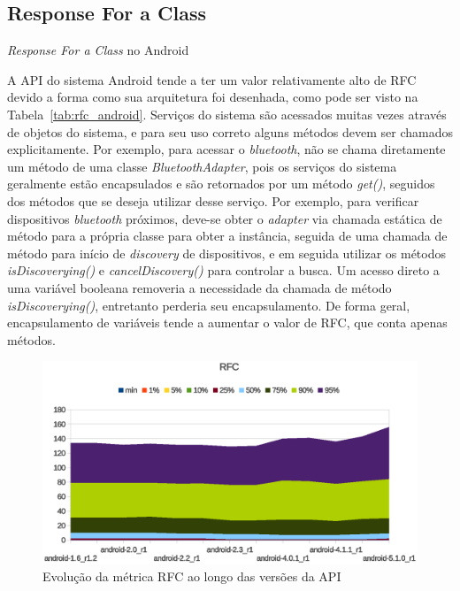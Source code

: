 \subsection{Response For a Class}

\begin{table}[!htb]
\centering
{}

\caption{\textit{Response For a Class} no Android}
\label{tab:rfc_android}
\end{table}

A API do sistema Android tende a ter um valor relativamente alto de RFC devido a forma como sua arquitetura foi desenhada, como pode ser visto na Tabela~\ref{tab:rfc_android}. Serviços do sistema são acessados muitas vezes através de objetos do sistema, e para seu uso correto alguns métodos devem ser chamados explicitamente. Por exemplo, para acessar o \textit{bluetooth}, não se chama diretamente um método de uma classe \textit{BluetoothAdapter}, pois os serviços do sistema geralmente estão encapsulados e são retornados por um método \textit{get()}, seguidos dos métodos que se deseja utilizar desse serviço. Por exemplo, para verificar dispositivos \textit{bluetooth} próximos, deve-se obter o \textit{adapter} via chamada estática de método para a própria classe para obter a instância, seguida de uma chamada de método para início de \textit{discovery} de dispositivos, e em seguida utilizar os métodos \textit{isDiscoverying()} e \textit{cancelDiscovery()} para controlar a busca. Um acesso direto a uma variável booleana removeria a necessidade da chamada de método \textit{isDiscoverying()}, entretanto perderia seu encapsulamento. De forma geral, encapsulamento de variáveis tende a aumentar o valor de RFC, que conta apenas métodos. 

\begin{figure}[!htb]
\centering
\includegraphics [keepaspectratio=true,scale=0.85]{figuras/graphs/rfc_android.eps}
\caption{Evolução da métrica RFC ao longo das versões da API}
\label{fig:rfc_android}
\end{figure}

